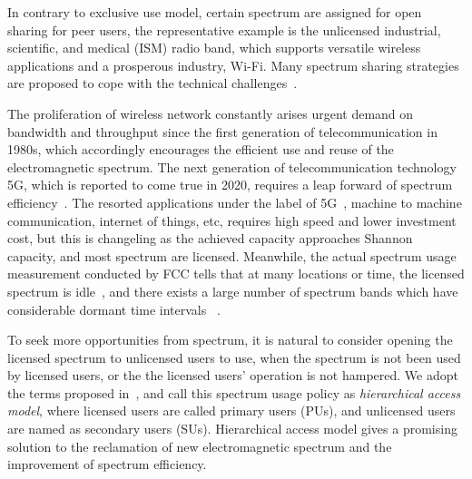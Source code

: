%
In contrary to exclusive use model, certain spectrum are assigned for open sharing for peer users, the representative example is the unlicensed industrial, scientific, and medical (\gls{ISM}) radio band, which supports versatile wireless applications and a prosperous industry, \ie Wi-Fi.
Many spectrum sharing strategies are proposed to cope with the technical challenges~\cite{Ko_DistributedCA}.

%
The proliferation of wireless network constantly arises urgent demand on bandwidth and throughput since the first generation of telecommunication in 1980s, which accordingly encourages the efficient use and reuse of the electromagnetic spectrum.
The next generation of telecommunication technology \gls{5G}, which is reported to come true in 2020, requires a leap forward of spectrum efficiency~\cite{5G_2014}.
The resorted applications under the label of 5G~\cite{5directions5G_2014}, \ie machine to machine communication, internet of things, etc, requires high speed and lower investment cost, but this is changeling as the achieved capacity approaches Shannon capacity, and most spectrum are licensed.
Meanwhile, the actual spectrum usage measurement conducted by FCC tells that at many locations or time, the licensed spectrum is idle~\cite{FCC_spectrumEfficiency_2002}, and there exists a large number of spectrum bands which have considerable dormant time intervals ~\cite{Akyildiz06survey}.

%
To seek more opportunities from spectrum, it is natural to consider opening the licensed spectrum to unlicensed users to use, when the spectrum is not been used by licensed users, or the the licensed users' operation is not hampered.
We adopt the terms proposed in~\cite{zhao_survey_DSA_2007}, and call this spectrum usage policy as \textit{hierarchical access model}, where licensed users are called primary users (\glspl{PU}), and unlicensed users are named as secondary users (\glspl{SU}).
Hierarchical access model gives a promising solution to the reclamation of new electromagnetic spectrum and the improvement of spectrum efficiency.




